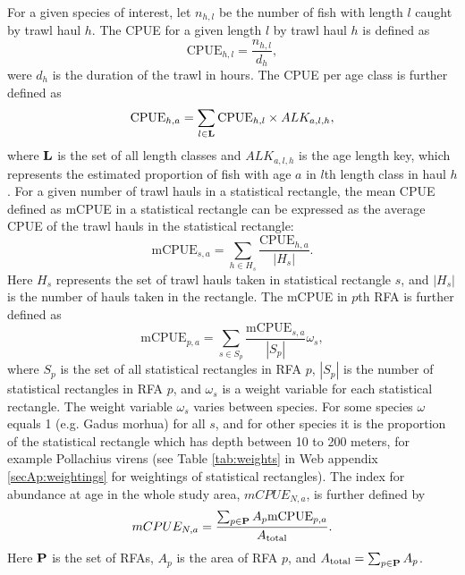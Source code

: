 \documentclass[a4paper 12pt]{article}
\numberwithin{equation}{section}
\begin{document}
For a given species of interest, let $n_{h,l}$ be the number of fish with length $l$ caught by trawl haul $h$. The CPUE for a given length $l$ by trawl haul $h$ is defined as 
\begin{equation}\label{eq:cpueHaul}
\mathrm{CPUE}_{h,l} =\frac{n_{h,l}}{d_h},
\end{equation}
were $d_h$ is the duration of the trawl in hours. The CPUE per age class is further defined as
\begin{equation}\label{eq:cpueALK}
\mathrm{CPUE}_{h,a} =\sum_{l \in {\bf L}}\mathrm{CPUE}_{h, l} \times ALK_{a,l,h},
\end{equation}
where ${\bf L}$ is the set of all length classes and $ALK_{a,l,h}$ is the age length key, which represents the estimated proportion of fish with age $a$ in $l$th length class in haul $h$. For a given number of trawl hauls in a statistical rectangle, the mean CPUE defined as  mCPUE  in a statistical rectangle can be expressed as the average CPUE of the trawl hauls in the statistical rectangle:
\begin{equation}\label{eq:cpueRec}
\mathrm{mCPUE}_{s,a} =\sum_{h \in H_{s}}\frac{\mathrm{CPUE}_{h,a}}{|H_{s}|}.
\end{equation}
Here $H_{s}$ represents the set of trawl hauls taken in statistical rectangle $s$, and $|H_{s}|$ is the number of hauls taken in the rectangle. The mCPUE in $p$th RFA is further defined as
\begin{equation}\label{eq:cpueRFA}
\mathrm{mCPUE}_{p,a} = \sum_{s \in S_{p}} \frac{\mathrm{mCPUE}_{s,a}}{|S_{p}|} \omega_s,
\end{equation}
where $S_{p}$ is the set of all statistical rectangles in RFA $p$, $|S_{p}|$ is the number of statistical rectangles in RFA $p$, and $\omega_s$ is a weight variable for each statistical rectangle. The weight variable $\omega_s$ varies between species. For some species $\omega$ equals 1 (e.g. Gadus morhua) for all $s$, and for other species it is the proportion of the statistical rectangle which has depth between 10 to 200 meters, for example Pollachius virens (see Table \ref{tab:weights} in Web appendix \ref{secAp:weightings}  for weightings of statistical rectangles).  The index for abundance at age in the whole study area, $mCPUE_{N,a} $, is further defined by
\begin{equation}
mCPUE_{N,a} = \frac{\sum_{p\in {\bf P}} A_{p}  \mathrm{mCPUE}_{p,a}}{A_{\text{total}}}.
\label{abundanceestimatornorthsea}
\end{equation}
Here ${\bf P}$ is the set of RFAs, $A_p$ is the area of RFA $p$, and $A_{\text{total}} = \sum_{p\in {\bf P}} A_{p}$.
\end{document}
